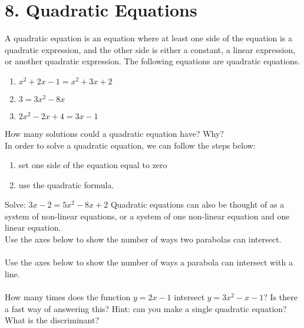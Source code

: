 \documentclass[12pt,fleqn]{book}
\begin{document}
\chapter{8. Quadratic Equations}
A quadratic equation is an equation where at least one side of the equation is a quadratic expression, and the other side is either a constant, a linear expression, or another quadratic expression.  The following equations are quadratic equations.
\begin{enumerate}
	\item $x^2+2x-1=x^2+3x+2$
	\item $3=3x^2-8x$
	\item $2x^2-2x+4=3x-1$
\end{enumerate}
How many solutions could a quadratic equation have?  Why?\\[2in]
In order to solve a quadratic equation, we can follow the steps below:
\begin{enumerate}
	\item set one side of the equation equal to zero
	\item use the quadratic formula.
\end{enumerate}
Solve: $3x-2=5x^2-8x+2$
\clearpage
Quadratic equations can also be thought of as a system of non-linear equations, or a system of one non-linear equation and one linear equation.
\\[1em]
Use the axes below to show the number of ways two parabolas can intersect.\\[1em]
\\[1em]
Use the axes below to show the number of ways a parabola can intersect with a line.
\\[1em]
\\[1em]
How many times does the function $y=2x-1$ intersect $y=3x^2-x-1$?  Is there a fast way of answering this?  Hint: can you make a single quadratic equation?  What is the discriminant?
\end{document}
